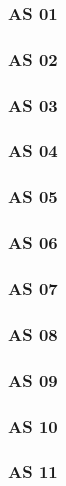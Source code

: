 \subsubsection{AS 01}

\subsubsection{AS 02}

\subsubsection{AS 03}

\subsubsection{AS 04}

\subsubsection{AS 05}

\subsubsection{AS 06}

\subsubsection{AS 07}

\subsubsection{AS 08}

\subsubsection{AS 09}

\subsubsection{AS 10}

\subsubsection{AS 11}

